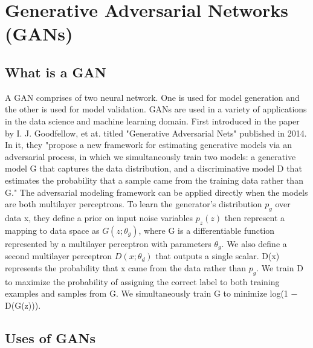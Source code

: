 \documentclass[conference]{IEEEtran}
\begin{document}
\section{Generative Adversarial Networks (GANs)}
\subsection{What is a GAN}

A GAN comprises of two neural network. One is used for model generation and the other is used for model validation. GANs are used in a variety of applications in the data science and machine learning domain. First introduced in the paper by I. J. Goodfellow, et at. titled "Generative Adversarial Nets" published in 2014. In it, they "propose a new framework for estimating generative models via an adversarial
process, in which we simultaneously train two models: a generative model G
that captures the data distribution, and a discriminative model D that estimates
the probability that a sample came from the training data rather than G." The adversarial modeling framework can be applied directly when the models are both
multilayer perceptrons. To learn the generator’s distribution $p_{g}$ over data x, they define a prior on input noise variables $p_{z}(z)$ then represent a mapping to data space as $G(z; \theta_{g})$, where G is a
differentiable function represented by a multilayer perceptron with parameters $θ_{g}$. We also define a
second multilayer perceptron $D(x; θ_{d})$ that outputs a single scalar. D(x) represents the probability
that x came from the data rather than $p_{g}$. We train D to maximize the probability of assigning the
correct label to both training examples and samples from G. We simultaneously train G to minimize
log(1 − D(G(z))). 
\cite{b1}\newline 

\subsection{Uses of GANs}
\end{document}

